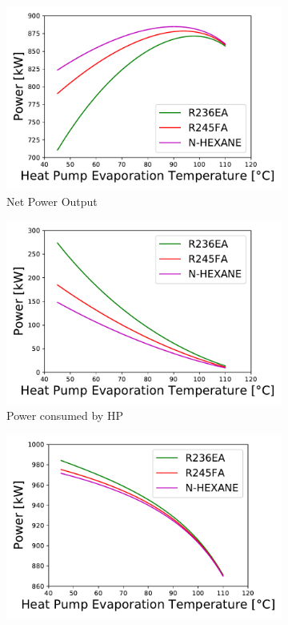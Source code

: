 \documentclass[a4paper,12pt]{article}
\begin{document}
\begin{figure}[H]
   \begin{subfigure}[H]{.32\textwidth}
      \centering
      \includegraphics[scale = 0.35]{Images/P_NET_FLUIDS_HP.pdf}
      \caption{Net Power Output}
      \label{fig:P_NET_HP}
    \end{subfigure}
    \begin{subfigure}[H]{.32\textwidth}
      \centering
      \includegraphics[scale = 0.35]{Images/P_HP_FLUIDS_HP.pdf}
      \caption{Power consumed by HP}
      \label{fig:P_HP_HP}
    \end{subfigure}
    \begin{subfigure}[H]{.32\textwidth}
      \centering
      \includegraphics[scale = 0.35]{Images/P_ORC_FLUIDS_HP.pdf}

\end{subfigure}
\end{figure}
\end{document}
